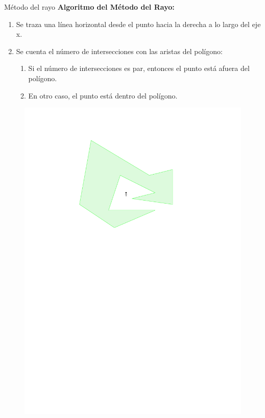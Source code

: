 \documentclass[aspectratio=169,xcolor=dvipsnames, t]{beamer}
\begin{document}
\begin{frame}[c]{Método del rayo}
  \textbf{Algoritmo del Método del Rayo:}
  \begin{enumerate}
  \item Se traza una línea horizontal desde el punto hacia la derecha a lo largo del eje x.
  \item Se cuenta el número de intersecciones con las aristas del polígono:
    \begin{enumerate}
    \item Si el número de intersecciones es par, entonces el punto está afuera del polígono.
    \item En otro caso, el punto está dentro del polígono.
    \end{enumerate}
  \end{enumerate}
  
  \begin{figure}
    \centering
    \includegraphics[width=\linewidth, height=0.5\textheight, page=4, keepaspectratio]{IPE/pip.pdf}
  \end{figure}
\end{frame}
\end{document}
